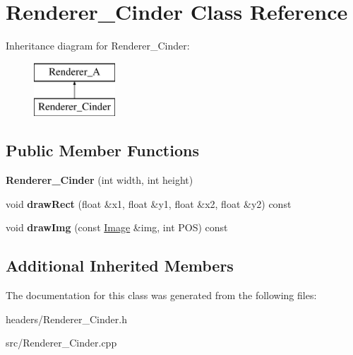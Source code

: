 \hypertarget{class_renderer___cinder}{\section{Renderer\-\_\-\-Cinder Class Reference}
\label{class_renderer___cinder}
}
Inheritance diagram for Renderer\-\_\-\-Cinder\-:\begin{figure}[H]
\begin{center}
\leavevmode
\includegraphics[height=2.000000cm]{class_renderer___cinder}
\end{center}
\end{figure}
\subsection*{Public Member Functions}
\begin{DoxyCompactItemize}
\item 
\hypertarget{class_renderer___cinder_af66dfa977f433a3fba7c74fd8afdb292}{{\bfseries Renderer\-\_\-\-Cinder} (int width, int height)}\label{class_renderer___cinder_af66dfa977f433a3fba7c74fd8afdb292}

\item 
\hypertarget{class_renderer___cinder_ae14f510b0f03226b9067ad11b3711c13}{void {\bfseries draw\-Rect} (float \&x1, float \&y1, float \&x2, float \&y2) const }\label{class_renderer___cinder_ae14f510b0f03226b9067ad11b3711c13}

\item 
\hypertarget{class_renderer___cinder_ad6700d502a42c60b2c97dd6e2b44b80a}{void {\bfseries draw\-Img} (const \hyperlink{class_image}{Image} \&img, int P\-O\-S) const }\label{class_renderer___cinder_ad6700d502a42c60b2c97dd6e2b44b80a}

\end{DoxyCompactItemize}
\subsection*{Additional Inherited Members}


The documentation for this class was generated from the following files\-:\begin{DoxyCompactItemize}
\item 
headers/Renderer\-\_\-\-Cinder.\-h\item 
src/Renderer\-\_\-\-Cinder.\-cpp\end{DoxyCompactItemize}
